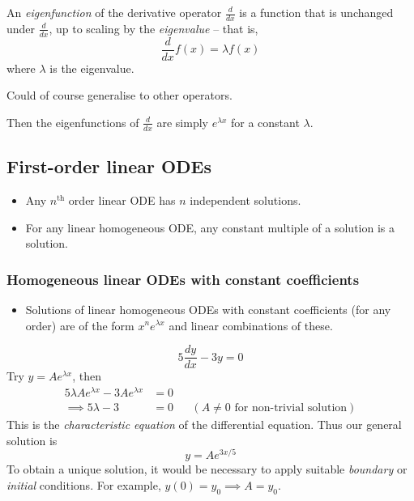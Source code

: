 \documentclass{../template/note}
\begin{document}
    \begin{definition}[Eigenfunctions]
        An \emph{eigenfunction} of the derivative operator \(\frac{d}{dx}\) is a function that is unchanged under \(\frac{d}{dx}\), up to scaling by the \emph{eigenvalue} -- that is,
        \[
            \frac{d}{dx} f(x) = \lambda f(x)
        \]
        where \(\lambda\) is the eigenvalue.
    \end{definition}

    \begin{remark*}
        Could of course generalise to other operators.
    \end{remark*}
    
    
    Then the eigenfunctions of \(\frac{d}{dx}\) are simply \(e^{\lambda x}\) for a constant \(\lambda\).
    
    \subsection{First-order linear ODEs}

    \begin{itemize}
        \item Any \(n^\text{th}\) order linear ODE has \(n\) independent solutions.
        \item For any linear homogeneous ODE, any constant multiple of a solution is a solution.
    \end{itemize}
    
    \subsubsection{Homogeneous linear ODEs with constant coefficients}

    \begin{itemize}
        \item Solutions of linear homogeneous ODEs with constant coefficients (for any order) are of the form \(x^ne^{\lambda x}\) and linear combinations of these.
    \end{itemize}
    
    \begin{example}
        \[
            5 \frac{dy}{dx} - 3y = 0
        \]
        Try \(y = Ae^{\lambda x}\), then
        \begin{align*}
            5 \lambda Ae^{\lambda x} - 3A e^{\lambda x} &= 0 \\
            \implies 5 \lambda - 3 &= 0 && (A \neq 0 \text{ for non-trivial solution})
        \end{align*}
        This is the \emph{characteristic equation} of the differential equation. Thus our general solution is
        \[
            y = Ae^{3x/5}
        \]
        To obtain a unique solution, it would be necessary to apply suitable \emph{boundary} or \emph{initial} conditions. For example, \(y(0) = y_0 \implies A = y_0\).
    \end{example}
    
\end{document}
